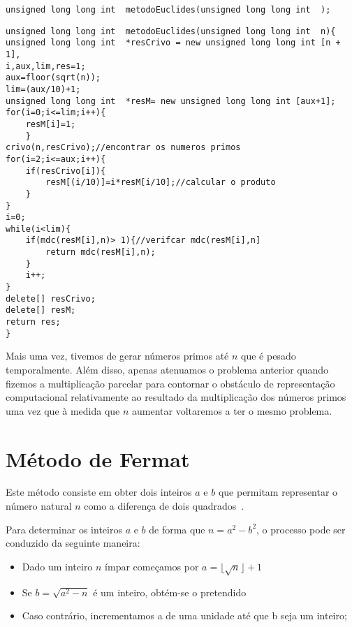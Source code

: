 \begin{lstlisting}[frame=single,mathescape=true,caption={Criptoanálise RSA ---Especificação de \texttt{MétodoEuclides}},captionpos=b,label={lst:metodoEuclides},basicstyle=\footnotesize]
unsigned long long int  metodoEuclides(unsigned long long int  );
\end{lstlisting}

\begin{lstlisting}[frame=single,mathescape=true,caption={Método de Euclides},captionpos=b,label={lst:MetodoEuclides},basicstyle=\footnotesize]
unsigned long long int  metodoEuclides(unsigned long long int  n){
unsigned long long int  *resCrivo = new unsigned long long int [n + 1],
i,aux,lim,res=1;
aux=floor(sqrt(n));
lim=(aux/10)+1;
unsigned long long int  *resM= new unsigned long long int [aux+1];
for(i=0;i<=lim;i++){
    resM[i]=1;
    }
crivo(n,resCrivo);//encontrar os numeros primos
for(i=2;i<=aux;i++){
    if(resCrivo[i]){
        resM[(i/10)]=i*resM[i/10];//calcular o produto
    }
}
i=0;
while(i<lim){
    if(mdc(resM[i],n)> 1){//verifcar mdc(resM[i],n]
        return mdc(resM[i],n);
    }		
    i++;
}
delete[] resCrivo;
delete[] resM;
return res;
}
\end{lstlisting}

Mais uma vez, tivemos de gerar números primos até $n$ que é pesado temporalmente. Além disso, apenas atenuamos o problema anterior quando fizemos a multiplicação parcelar para contornar o obstáculo de representação computacional relativamente ao resultado da  multiplicação dos números primos uma vez que à medida que $n$ aumentar voltaremos a ter o mesmo problema.

\section{Método de Fermat}
\label{sec:MetodoFermat}

Este método consiste em obter dois inteiros $a$ e $b$ que permitam representar o número natural $n$ como a diferença de dois quadrados~\cite{Quaresma2009a}.

Para determinar os inteiros $a$ e $b$ de forma que $n=a^2 - b^2$, o processo pode ser conduzido da seguinte maneira:
\begin{itemize}
    \item[] Dado um inteiro $n$ ímpar começamos por $a=\lfloor \sqrt{n} \rfloor +1$
    \item[] Se $b=\sqrt{a^2-n}$ é um inteiro, obtém-se o pretendido
    \item[] Caso contrário, incrementamos a de uma unidade até que b seja um inteiro;
\end{itemize}


